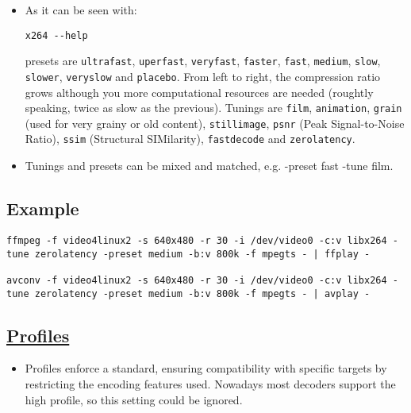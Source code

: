 \begin{itemize}
\item As it can be seen with:

\begin{verbatim}
x264 --help
\end{verbatim}

  presets are \texttt{ultrafast}, \texttt{uperfast},
  \texttt{veryfast}, \texttt{faster}, \texttt{fast}, \texttt{medium},
  \texttt{slow}, \texttt{slower}, \texttt{veryslow} and
  \texttt{placebo}. From left to right, the compression ratio grows
  although you more computational resources are needed (roughtly
  speaking, twice as slow as the previous). Tunings are \texttt{film},
  \texttt{animation}, \texttt{grain} (used for very grainy or old
  content), \texttt{stillimage}, \texttt{psnr} (Peak Signal-to-Noise
  Ratio), \texttt{ssim} (Structural SIMilarity), \texttt{fastdecode}
  and \texttt{zerolatency}.

\item Tunings and presets can be mixed and matched,
  e.g. -preset fast -tune film.

\end{itemize}

\subsection{Example}

\begin{verbatim}
ffmpeg -f video4linux2 -s 640x480 -r 30 -i /dev/video0 -c:v libx264 -tune zerolatency -preset medium -b:v 800k -f mpegts - | ffplay -

avconv -f video4linux2 -s 640x480 -r 30 -i /dev/video0 -c:v libx264 -tune zerolatency -preset medium -b:v 800k -f mpegts - | avplay -
\end{verbatim}


\subsection{\href{https://trac.ffmpeg.org/wiki/Encode/H.264}{Profiles}}

\begin{itemize}

\item Profiles enforce a standard, ensuring compatibility with
  specific targets by restricting the encoding features used. Nowadays
  most decoders support the high profile, so this setting could be
  ignored.

\end{itemize}

